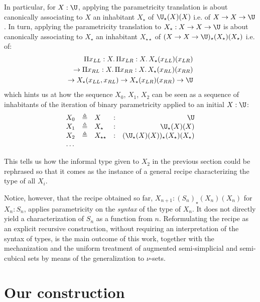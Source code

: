 \documentclass{msc}
\newcommand{\defeq}{\ensuremath{\triangleq}}
\newcommand{\kstar}{{\star}}
\begin{document}
In particular, for $X: \U$, applying the parametricity translation is about canonically associating to $X$ an inhabitant $X_\kstar$ of ${\U}_\kstar(X)(X)$ i.e. of $X \rightarrow X \rightarrow \U$. In turn, applying the parametricity translation to $X_\kstar: X \rightarrow X \rightarrow \U$ is about canonically associating to $X_\kstar$ an inhabitant $X_{\kstar\kstar}$ of $(X \rightarrow X \rightarrow \U)_\kstar(X_\kstar)(X_\kstar)$ i.e. of:
\begin{align*}
  \Pi x_{LL}: X.\, \Pi x_{LR}: X.\, X_\kstar(x_{LL})(x_{LR})             \\
  \rightarrow \Pi x_{RL}: X.\, \Pi x_{RR}: X.\, X_\kstar(x_{RL})(x_{RR}) \\ \rightarrow X_\kstar(x_{LL}, x_{RL}) \rightarrow X_\kstar(x_{LR})(x_{RR})  \rightarrow \U
\end{align*}
which hints us at how the sequence $X_0$, $X_1$, $X_2$ can be seen as a sequence of inhabitants of the iteration of binary parametricity applied to an initial $X: \U$:
\begin{equation*}
  \begin{array}{llllr}
    X_0 & \defeq & X                & : & \U                                               \\
    X_1 & \defeq & X_\kstar         & : & {\U}_\kstar(X)(X)                                \\
    X_2 & \defeq & X_{\kstar\kstar} & : & ({\U}_\kstar(X)(X))_{\kstar}(X_\kstar)(X_\kstar) \\
    \ldots
  \end{array}
\end{equation*}

This tells us how the informal type given to $X_2$ in the previous section could be rephrased so that it comes as the instance of a general recipe characterizing the type of all $X_i$.

Notice, however, that the recipe obtained so far, $X_{n + 1}: ({S_n})_\kstar(X_n)(X_n)$ for $X_n: S_n$, applies parametricity on the \emph{syntax} of the type of $X_n$. It does not directly yield a characterization of $S_n$ as a function from $n$. Reformulating the recipe as an explicit recursive construction, without requiring an interpretation of the syntax of types, is the main outcome of this work, together with the mechanization and the uniform treatment of augmented semi-simplicial and semi-cubical sets by means of the generalization to $\nu$-sets.

\section{Our construction}
\end{document}
